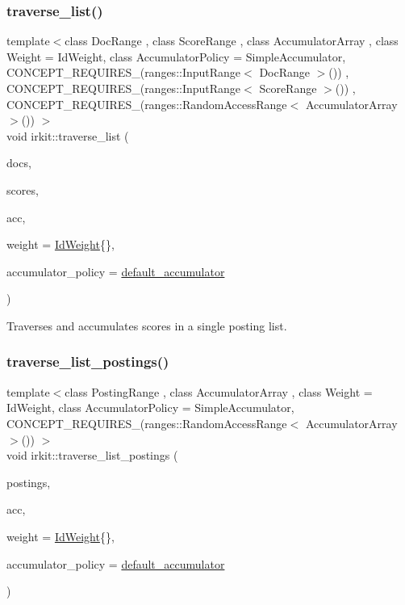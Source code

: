 \subsubsection{\texorpdfstring{traverse\+\_\+list()}{traverse\_list()}}
{\footnotesize\ttfamily template$<$class Doc\+Range , class Score\+Range , class Accumulator\+Array , class Weight  = Id\+Weight, class Accumulator\+Policy  = Simple\+Accumulator, C\+O\+N\+C\+E\+P\+T\+\_\+\+R\+E\+Q\+U\+I\+R\+E\+S\+\_\+(ranges\+::\+Input\+Range$<$ Doc\+Range $>$()) , C\+O\+N\+C\+E\+P\+T\+\_\+\+R\+E\+Q\+U\+I\+R\+E\+S\+\_\+(ranges\+::\+Input\+Range$<$ Score\+Range $>$()) , C\+O\+N\+C\+E\+P\+T\+\_\+\+R\+E\+Q\+U\+I\+R\+E\+S\+\_\+(ranges\+::\+Random\+Access\+Range$<$ Accumulator\+Array $>$()) $>$ \\
void irkit\+::traverse\+\_\+list (\begin{DoxyParamCaption}\item[{const Doc\+Range \&}]{docs,  }\item[{const Score\+Range \&}]{scores,  }\item[{Accumulator\+Array \&}]{acc,  }\item[{Weight}]{weight = {\ttfamily \hyperlink{structirkit_1_1IdWeight}{Id\+Weight}\{\}},  }\item[{Accumulator\+Policy \&}]{accumulator\+\_\+policy = {\ttfamily \hyperlink{namespaceirkit_a823671564bf545991e9708011e4a8df1}{default\+\_\+accumulator}} }\end{DoxyParamCaption})}



Traverses and accumulates scores in a single posting list. 

\mbox{\label{namespaceirkit_ad498b50414a2c4e8d90325839219f8eb}} 
\subsubsection{\texorpdfstring{traverse\+\_\+list\+\_\+postings()}{traverse\_list\_postings()}}
{\footnotesize\ttfamily template$<$class Posting\+Range , class Accumulator\+Array , class Weight  = Id\+Weight, class Accumulator\+Policy  = Simple\+Accumulator, C\+O\+N\+C\+E\+P\+T\+\_\+\+R\+E\+Q\+U\+I\+R\+E\+S\+\_\+(ranges\+::\+Random\+Access\+Range$<$ Accumulator\+Array $>$()) $>$ \\
void irkit\+::traverse\+\_\+list\+\_\+postings (\begin{DoxyParamCaption}\item[{const Posting\+Range \&}]{postings,  }\item[{Accumulator\+Array \&}]{acc,  }\item[{Weight}]{weight = {\ttfamily \hyperlink{structirkit_1_1IdWeight}{Id\+Weight}\{\}},  }\item[{Accumulator\+Policy \&}]{accumulator\+\_\+policy = {\ttfamily \hyperlink{namespaceirkit_a823671564bf545991e9708011e4a8df1}{default\+\_\+accumulator}} }\end{DoxyParamCaption})}

